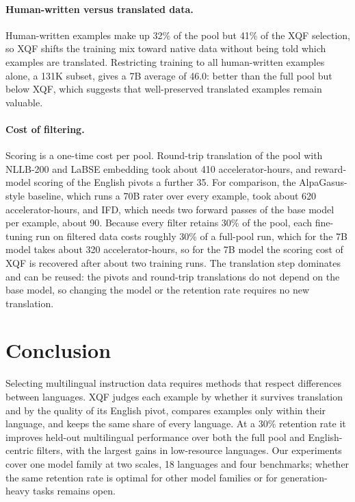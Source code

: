 \documentclass{article}
\begin{document}
\paragraph{Human-written versus translated data.}
Human-written examples make up 32\% of the pool but 41\% of the XQF selection, so XQF shifts the training mix toward native data without being told which examples are translated. Restricting training to all human-written examples alone, a 131K subset, gives a 7B average of 46.0: better than the full pool but below XQF, which suggests that well-preserved translated examples remain valuable.

\paragraph{Cost of filtering.}
Scoring is a one-time cost per pool. Round-trip translation of the pool with NLLB-200 and LaBSE embedding took about 410 accelerator-hours, and reward-model scoring of the English pivots a further 35. For comparison, the AlpaGasus-style baseline, which runs a 70B rater over every example, took about 620 accelerator-hours, and IFD, which needs two forward passes of the base model per example, about 90. Because every filter retains 30\% of the pool, each fine-tuning run on filtered data costs roughly 30\% of a full-pool run, which for the 7B model takes about 320 accelerator-hours, so for the 7B model the scoring cost of XQF is recovered after about two training runs. The translation step dominates and can be reused: the pivots and round-trip translations do not depend on the base model, so changing the model or the retention rate requires no new translation.

\section{Conclusion}
\label{sec:conclusion}

Selecting multilingual instruction data requires methods that respect differences between languages. XQF judges each example by whether it survives translation and by the quality of its English pivot, compares examples only within their language, and keeps the same share of every language. At a 30\% retention rate it improves held-out multilingual performance over both the full pool and English-centric filters, with the largest gains in low-resource languages. Our experiments cover one model family at two scales, 18 languages and four benchmarks; whether the same retention rate is optimal for other model families or for generation-heavy tasks remains open.
\end{document}
